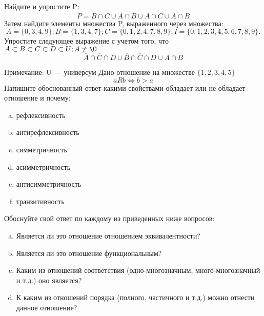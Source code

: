 \documentclass[10pt]{exam}
\begin{document}
\begin{questions}
\question
Найдите и упростите P:
\begin{equation*}
\overline{P} = B \cap \overline{C} \cup A \cap B \cup \overline{A} \cap C \cup \overline{A} \cap B
\end{equation*}
Затем найдите элементы множества P, выраженного через множества:
\begin{equation*}
A = \{0, 3, 4, 9\}; 
B = \{1, 3, 4, 7\};
C = \{0, 1, 2, 4, 7, 8, 9\};
I = \{0, 1, 2, 3, 4, 5, 6, 7, 8, 9\}.
\end{equation*}\question
Упростите следующее выражение с учетом того, что $A\subset B \subset C \subset D \subset U; A \neq \O$
\begin{equation*}
\overline{A} \cap \overline{C} \cap D \cup \overline{B} \cap \overline{C} \cap D \cup A \cap B
\end{equation*}

Примечание: U — универсум\question
Дано отношение на множестве $\{1, 2, 3, 4, 5\}$ 
\begin{equation*}
aRb \iff b > a
\end{equation*}
Напишите обоснованный ответ какими свойствами обладает или не обладает отношение и почему:   
\begin{enumerate} [a)]\setcounter{enumi}{0}
\item рефлексивность
\item антирефлексивность
\item симметричность
\item асимметричность
\item антисимметричность
\item транзитивность
\end{enumerate}

Обоснуйте свой ответ по каждому из приведенных ниже вопросов:
\begin{enumerate} [a)]\setcounter{enumi}{0}
    \item Является ли это отношение отношением эквивалентности?
    \item Является ли это отношение функциональным?
    \item Каким из отношений соответствия (одно-многозначным, много-многозначный и т.д.) оно является?
    \item К каким из отношений порядка (полного, частичного и т.д.) можно отнести данное отношение?
\end{enumerate}


\end{questions}
\end{document}
